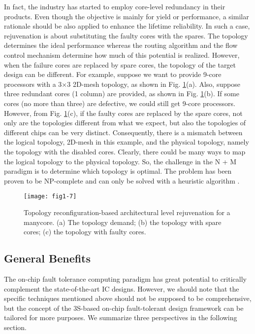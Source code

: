 In fact, the industry has started to employ core-level redundancy in their products. Even though the objective is mainly for yield or performance, a similar rationale should be also applied to enhance the lifetime reliability. In such a case, rejuvenation is about substituting the faulty cores with the spares. The topology determines the ideal performance whereas the routing algorithm and the flow control mechanism determine how much of this potential is realized. However, when the failure cores are replaced by spare cores, the topology of the target design can be different. For example, suppose we want to provide 9-core processors with a 3×3 2D-mesh topology, as shown in Fig. \ref{fig:topology-reconfig}(a). Also, suppose three redundant cores (1 column) are provided, as shown in Fig. \ref{fig:topology-reconfig}(b). If some cores (no more than three) are defective, we could still get 9-core processors. 
However, from Fig. \ref{fig:topology-reconfig}(c), if the faulty cores are replaced by the spare cores, not only are the topologies different from what we expect, but also the topologies of different chips can be very distinct. Consequently, there is a mismatch between the logical topology, 2D-mesh in this example, and the physical topology, namely the topology with the disabled cores. Clearly, there could be many ways to map the logical topology to the physical topology. So, the challenge in the N + M paradigm is to determine which topology is optimal. The problem has been proven to be NP-complete and can only be solved with a heuristic algorithm \cite{zhang2009topology}.

\begin{figure}[t]
\centering
\texttt{[image: fig1-7]}
\caption{Topology reconfiguration-based architectural level rejuvenation for a manycore. (a) The topology demand;
(b) the topology with spare cores; (c) the topology with faulty cores.}
\label{fig:topology-reconfig} 
\end{figure}

\subsection{General Benefits}
The on-chip fault tolerance computing paradigm has great potential to critically complement the state-of-the-art IC designs. However, we should note that the specific techniques mentioned above should not be supposed to be comprehensive, but the concept of the 3S-based on-chip fault-tolerant design framework can be tailored for more purposes. We summarize three perspectives in the following section.

